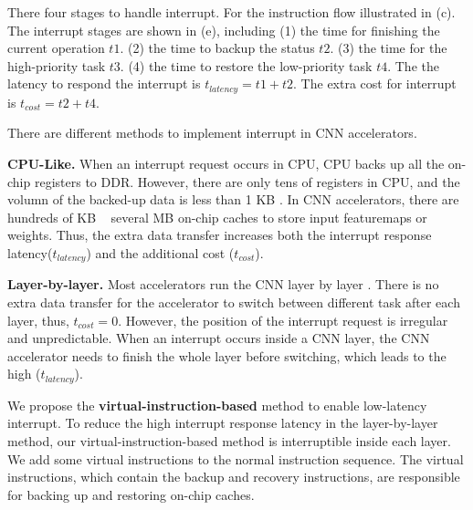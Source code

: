 There four stages to handle interrupt. For the instruction flow illustrated in (c). The interrupt stages are shown in (e), including (1) the time for finishing the current operation $t1$. (2) the time to backup the status $t2$. (3) the time for the high-priority task $t3$. (4) the time to restore the low-priority task $t4$. The the latency to respond the interrupt is $t_{latency} = t1+t2$. The extra cost for interrupt is $t_{cost}=t2+t4$. 

There are different methods to implement interrupt in CNN accelerators.

\textbf{CPU-Like.}
When an interrupt request occurs in CPU, CPU backs up all the on-chip registers to DDR. However, there are only tens of registers in CPU, and the volumn of the backed-up data is less than 1 KB \cite{furber2000arm}. In CNN accelerators, there are hundreds of KB ~ several MB on-chip caches \cite{qiu2016going, guo2017angel} to store input featuremaps or weights. 
Thus, the extra data transfer increases both the interrupt response latency($t_{latency}$) and the additional cost ($t_{cost}$).

\textbf{Layer-by-layer.}
Most accelerators run the CNN layer by layer \cite{qiu2016going,guo2017angel}. 
There is no extra data transfer for the accelerator to switch between different task after each layer, thus, $t_{cost}=0$. 
However, the position of the interrupt request is irregular and unpredictable. When an interrupt occurs inside a CNN layer, the CNN accelerator needs to finish the whole layer before switching, which leads to the high ($t_{latency}$).



We propose the \textbf{virtual-instruction-based} method to enable low-latency interrupt. 
To reduce the high interrupt response latency in the layer-by-layer method, our virtual-instruction-based method is interruptible inside each layer. We add some virtual instructions to the normal instruction sequence.
The virtual instructions, which contain the backup and recovery instructions, are responsible for backing up and restoring on-chip caches. 

